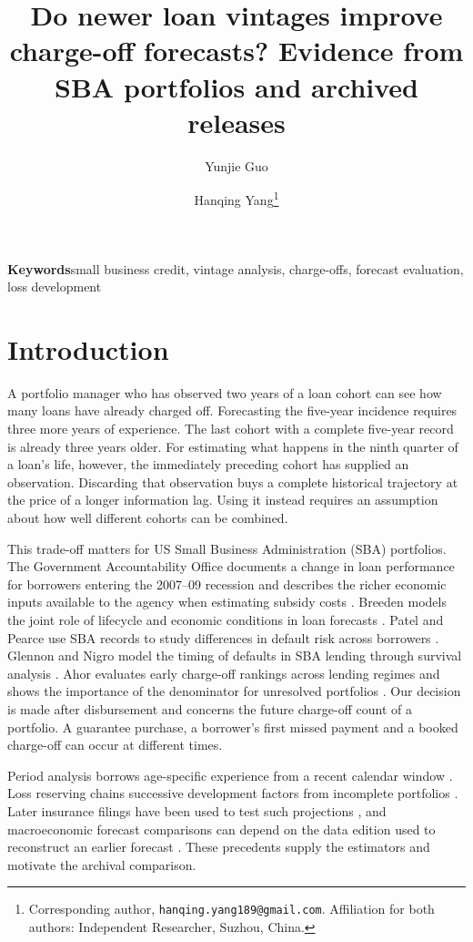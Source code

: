 \documentclass[11pt]{article}
\title{Do newer loan vintages improve charge-off forecasts? Evidence from SBA portfolios and archived releases}
\author{Yunjie Guo \and Hanqing Yang\thanks{Corresponding author, \texttt{hanqing.yang189@gmail.com}. Affiliation for both authors: Independent Researcher, Suzhou, China.}}
\date{}
\begin{document}
\maketitle
\begin{abstract}

\end{abstract}
\noindent\textbf{Keywords}\quad small business credit, vintage analysis, charge-offs, forecast evaluation, loss development

\section{Introduction}
A portfolio manager who has observed two years of a loan cohort can see how many loans have already charged off. Forecasting the five-year incidence requires three more years of experience. The last cohort with a complete five-year record is already three years older. For estimating what happens in the ninth quarter of a loan's life, however, the immediately preceding cohort has supplied an observation. Discarding that observation buys a complete historical trajectory at the price of a longer information lag. Using it instead requires an assumption about how well different cohorts can be combined.

This trade-off matters for US Small Business Administration (SBA) portfolios. The Government Accountability Office documents a change in loan performance for borrowers entering the 2007--09 recession and describes the richer economic inputs available to the agency when estimating subsidy costs \cite{gao}. Breeden models the joint role of lifecycle and economic conditions in loan forecasts \cite{breeden}. Patel and Pearce use SBA records to study differences in default risk across borrowers \cite{patel}. Glennon and Nigro model the timing of defaults in SBA lending through survival analysis \cite{glennon}. Ahor evaluates early charge-off rankings across lending regimes and shows the importance of the denominator for unresolved portfolios \cite{ahor}. Our decision is made after disbursement and concerns the future charge-off count of a portfolio. A guarantee purchase, a borrower's first missed payment and a booked charge-off can occur at different times.

Period analysis borrows age-specific experience from a recent calendar window \cite{brenner}. Loss reserving chains successive development factors from incomplete portfolios \cite{mack}. Later insurance filings have been used to test such projections \cite{meyers}, and macroeconomic forecast comparisons can depend on the data edition used to reconstruct an earlier forecast \cite{stark}. These precedents supply the estimators and motivate the archival comparison.
\end{document}
